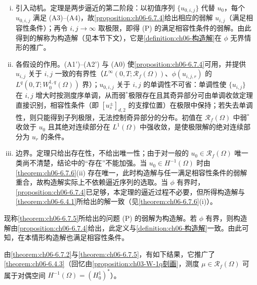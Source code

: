 \documentclass[../../main.tex]{subfiles}%
\begin{document}
\begin{remark}\label{remark:ch06-6.7.5动机}
\begin{enumerate}[(i)]
\item 引入动机。定理是两步逼近的第二阶段：以初值序列 $\{u_{0,i,j}\}$ 代替 $u_0$，每个 $u_{0,i,j}$ 满足 (A3)--(A4)，故\cref{proposition:ch06-6.7.4}给出相应的弱解 $u_{i,j}$（满足相容性条件）；再令 $i,j\to\infty$ 取极限，即得 (P) 的满足相容性条件的弱解。由此得到的解称为构造解（见本节下文），它是\cref{definition:ch06-构造解}在 $\phi$ 无界情形的推广。

\item 各假设的作用。(A1')--(A2') 与 (A0) 使\cref{proposition:ch06-6.7.4}可用，并提供 $u_{i,j}$ 关于 $i,j$ 一致的有界性（$L^\infty(0,T;\mathscr{R}_f(\Omega))$、$\phi(u_{i,j,r})$ 的 $L^q(0,T;W^{1,q}_0(\Omega))$ 界）；$u_{0,i,j}$ 关于 $i,j$ 的单调性不可省：单调性使 $\{u_{i,j}\}$ 在 $i,j$ 增大时按测度序单调，从而弱$^*$极限存在且其奇异部分可由单调收敛定理直接识别，相容性条件（即 $[u^\pm_s]_{d,2}$ 的支撑位置）在极限中保持；若失去单调性，则只能得到子列极限，无法控制奇异部分的分布。初值在 $\mathscr{R}_f(\Omega)$ 中弱$^*$收敛于 $u_0$ 且其绝对连续部分在 $L^1(\Omega)$ 中强收敛，是使极限解的绝对连续部分为 $u_r$ 的条件。

\item 边界。定理只给出存在性，不给出唯一性；由于对一般的 $u_0\in\mathscr{R}_f(\Omega)$ 唯一类尚不清楚，结论中的“存在”不能加强。当 $u_0\in H^{-1}(\Omega)$ 时由\cref{theorem:ch06-6.7.6}(ii) 存在唯一，此时构造解与任一满足相容性条件的弱解重合，故构造解实际上不依赖逼近序列的选取。当 $\phi$ 有界时，\cref{proposition:ch06-6.7.4}已足够，本定理的逼近过程不必要，但所得构造解与\cref{theorem:ch06-6.4.1}所给出的解一致（见\cref{theorem:ch06-6.7.6}(i)）。
\end{enumerate}
\end{remark}

现称\cref{theorem:ch06-6.7.5}所给出的问题 (P) 的弱解为构造解。若 $\phi$ 有界，则构造解由\cref{proposition:ch06-6.7.4}给出，此定义与\cref{definition:ch06-构造解}一致。由此可知，在本情形构造解也满足相容性条件。

由\cref{theorem:ch06-6.7.2}与\cref{theorem:ch06-6.7.5}，有如下结果，它推广了\cref{theorem:ch06-6.4.3}（回忆由\cref{proposition:ch03-W-1q刻画}，测度 $\mu\in\mathscr{R}_f(\Omega)$ 可属于对偶空间 $H^{-1}(\Omega)=(H^1_0)^*$）。
\end{document}

